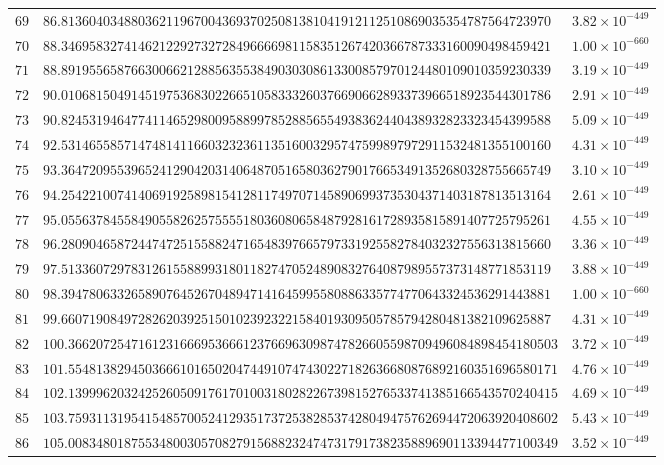 \documentclass[12pt,reqno]{amsart}
\theoremstyle{remark}
\begin{document}
\begin{longtable}{clc}
$69$ & $86.8136040348803621196700436937025081381041912112510869035354787564723970$ & $3.82\times 10^{-449}$ \\
$70$ & $88.3469583274146212292732728496666981158351267420366787333160090498459421$ & $1.00\times 10^{-660}$ \\
$71$ & $88.8919556587663006621288563553849030308613300857970124480109010359230339$ & $3.19\times 10^{-449}$ \\
$72$ & $90.0106815049145197536830226651058333260376690662893373966518923544301786$ & $2.91\times 10^{-449}$ \\
$73$ & $90.8245319464774114652980095889978528856554938362440438932823323454399588$ & $5.09\times 10^{-449}$ \\
$74$ & $92.5314655857147481411660323236113516003295747599897972911532481355100160$ & $4.31\times 10^{-449}$ \\
$75$ & $93.3647209553965241290420314064870516580362790176653491352680328755665749$ & $3.10\times 10^{-449}$ \\
$76$ & $94.2542210074140691925898154128117497071458906993735304371403187813513164$ & $2.61\times 10^{-449}$ \\
$77$ & $95.0556378455849055826257555518036080658487928161728935815891407725795261$ & $4.55\times 10^{-449}$ \\
$78$ & $96.2809046587244747251558824716548397665797331925582784032327556313815660$ & $3.36\times 10^{-449}$ \\
$79$ & $97.5133607297831261558899318011827470524890832764087989557373148771853119$ & $3.88\times 10^{-449}$ \\
$80$ & $98.3947806332658907645267048947141645995580886335774770643324536291443881$ & $1.00\times 10^{-660}$ \\
$81$ & $99.6607190849728262039251501023923221584019309505785794280481382109625887$ & $4.31\times 10^{-449}$ \\
$82$ & $100.3662072547161231666953666123766963098747826605598709496084898454180503$ & $3.72\times 10^{-449}$ \\
$83$ & $101.5548138294503666101650204744910747430227182636680876892160351696580171$ & $4.76\times 10^{-449}$ \\
$84$ & $102.1399962032425260509176170100318028226739815276533741385166543570240415$ & $4.69\times 10^{-449}$ \\
$85$ & $103.7593113195415485700524129351737253828537428049475762694472063920408602$ & $5.43\times 10^{-449}$ \\
$86$ & $105.0083480187553480030570827915688232474731791738235889690113394477100349$ & $3.52\times 10^{-449}$ \\

\end{longtable}
\end{document}
